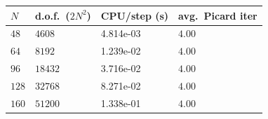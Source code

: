 \begin{tabular}{llll}
\toprule
$N$ & d.o.f.\ ($2N^2$) & CPU/step (s) & avg.\ Picard iter \\
\midrule
\(48\) & \(4608\) & 4.814e-03 & \(4.00\) \\
\(64\) & \(8192\) & 1.239e-02 & \(4.00\) \\
\(96\) & \(18432\) & 3.716e-02 & \(4.00\) \\
\(128\) & \(32768\) & 8.271e-02 & \(4.00\) \\
\(160\) & \(51200\) & 1.338e-01 & \(4.00\) \\
\bottomrule
\end{tabular}
